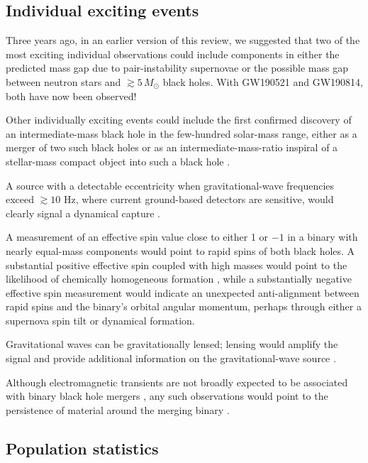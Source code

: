 \documentclass[review]{elsarticle}
\begin{document}
\subsection{Individual exciting events}
Three years ago, in an earlier version of this review, we suggested that two of the most exciting individual observations could include components in either the predicted mass gap due to pair-instability supernovae or the possible mass gap between neutron stars and $\gtrsim 5\, M_\odot$ black holes.  With GW190521 and GW190814, both have now been observed!

Other individually exciting events could include the first confirmed discovery of an intermediate-mass black hole in the few-hundred solar-mass range, either as a merger of two such black holes \citep[e.g.,][]{AmaroSeoaneSantamaria:2009,Veitch:2015,Graff:2015} or as an intermediate-mass-ratio inspiral of a stellar-mass compact object into such a black hole \citep[e.g.,][]{Mandel:2008,Haster:2015IMRI,Haster:2016}. 

A source with a detectable eccentricity when gravitational-wave frequencies exceed $\gtrsim 10$ Hz, where current ground-based detectors are sensitive, would clearly signal a dynamical capture \citep[e.g.,][]{Zevin:2017,Rodriguez:2018}. 

A measurement of an effective spin value close to either 1 or $-1$ in a binary with nearly equal-mass components would point to rapid spins of both black holes. A substantial positive effective spin coupled with high masses would point to the likelihood of chemically homogeneous formation \citep{Marchant:2016}, while a substantially negative effective spin measurement would indicate an unexpected anti-alignment between rapid spins and the binary's orbital angular momentum, perhaps through either a supernova spin tilt or dynamical formation.  

Gravitational waves can be gravitationally lensed; lensing would amplify the signal and provide additional information on the gravitational-wave source \citep[e.g.,][]{Broadhurst:2019,Hannuksela:2019,Marchant:2020}.

Although electromagnetic transients are not broadly expected to be associated with binary black hole mergers \citep[e.g.,][]{Lyutikov:2016}, any such observations would point to the persistence of material around the merging binary \citep[e.g.,][]{deMinkKing:2017}.

\subsection{Population statistics}
\end{document}

